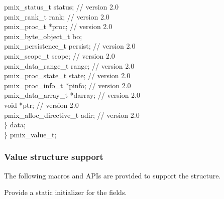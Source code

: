 {\hspace*{8\sigspace}pmix_status_t status;           // version 2.0 \\
\hspace*{8\sigspace}pmix_rank_t rank;               // version 2.0 \\
\hspace*{8\sigspace}pmix_proc_t *proc;              // version 2.0 \\
\hspace*{8\sigspace}pmix_byte_object_t bo; \\
\hspace*{8\sigspace}pmix_persistence_t persist;     // version 2.0 \\
\hspace*{8\sigspace}pmix_scope_t scope;             // version 2.0 \\
\hspace*{8\sigspace}pmix_data_range_t range;        // version 2.0 \\
\hspace*{8\sigspace}pmix_proc_state_t state;        // version 2.0 \\
\hspace*{8\sigspace}pmix_proc_info_t *pinfo;        // version 2.0 \\
\hspace*{8\sigspace}pmix_data_array_t *darray;      // version 2.0 \\
\hspace*{8\sigspace}void *ptr;                      // version 2.0 \\
\hspace*{8\sigspace}pmix_alloc_directive_t adir;    // version 2.0 \\
\hspace*{4\sigspace}\} data; \\
\} pmix_value_t;
}

\subsubsection{Value structure support}
The following macros and \acp{API} are provided to support the  structure.


Provide a static initializer for the  fields.

